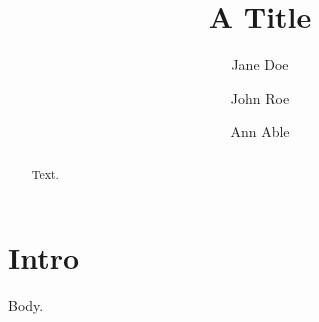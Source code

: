 \documentclass{aastex701}
\begin{document}
\title{A Title}
\author{Jane Doe}
\author{John Roe}
\email{}
\author{Ann Able}
\cofirstauthor
{}
\begin{abstract}
Text.
\end{abstract}
\section{Intro} Body.
\end{document}
